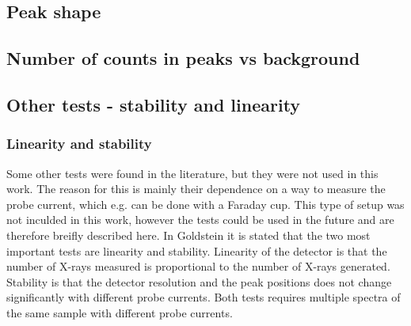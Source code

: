 

\subsection{Peak shape}
\label{theory:detector_status:peakshape}


\subsection{Number of counts in peaks vs background}
\label{theory:detector_status:counts}





\subsection{Other tests - stability and linearity}
\label{theory:detector_status:other}

\subsubsection*{Linearity and stability}
Some other tests were found in the literature, but they were not used in this work.
The reason for this is mainly their dependence on a way to measure the probe current, which e.g. can be done with a Faraday cup.
This type of setup was not inculded in this work, however the tests could be used in the future and are therefore breifly described here.
In Goldstein \cite[p. 232]{goldstein_scanning_2018} it is stated that the two most important tests are linearity and stability.
Linearity of the detector is that the number of X-rays measured is proportional to the number of X-rays generated.
Stability is that the detector resolution and the peak positions does not change significantly with different probe currents.
Both tests requires multiple spectra of the same sample with different probe currents.

